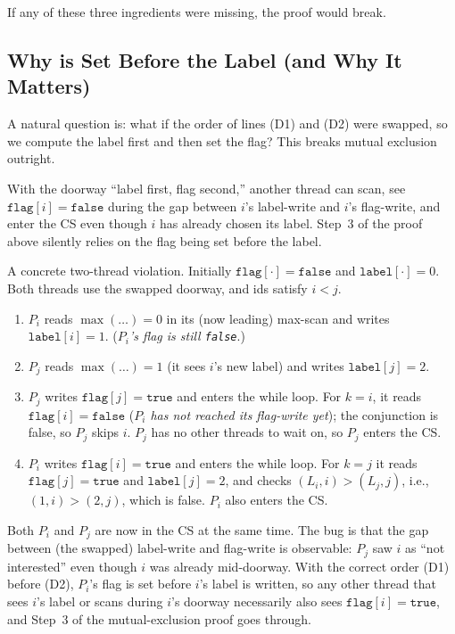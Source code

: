 If any of these three ingredients were missing, the proof would break.

\subsection{Why  is Set Before the Label (and Why It Matters)}

A natural question is: what if the order of lines (D1) and (D2) were swapped,
so we compute the label first and then set the flag? This breaks mutual
exclusion outright.

\begin{pppitfall}
\par
With the doorway ``label first, flag second,'' another thread can scan, see
$\texttt{flag}[i] = \texttt{false}$ during the gap between $i$'s label-write
and $i$'s flag-write, and enter the CS even though $i$ has already chosen its
label. Step~3 of the proof above silently relies on the flag being set before
the label.
\end{pppitfall}

\noindent
A concrete two-thread violation. Initially $\texttt{flag}[\cdot] = \texttt{false}$
and $\texttt{label}[\cdot] = 0$. Both threads use the swapped doorway, and ids
satisfy $i < j$.

\begin{enumerate}[nosep,leftmargin=2.2em]
  \item $P_i$ reads $\max(\ldots) = 0$ in its (now leading) max-scan and
        writes $\texttt{label}[i] = 1$. (\textit{$P_i$'s flag is still
        \texttt{false}}.)
  \item $P_j$ reads $\max(\ldots) = 1$ (it sees $i$'s new label) and writes
        $\texttt{label}[j] = 2$.
  \item $P_j$ writes $\texttt{flag}[j] = \texttt{true}$ and enters the while
        loop. For $k=i$, it reads $\texttt{flag}[i] = \texttt{false}$
        (\textit{$P_i$ has not reached its flag-write yet}); the conjunction is
        false, so $P_j$ skips $i$. $P_j$ has no other threads to wait on, so
        $P_j$ enters the CS.
  \item $P_i$ writes $\texttt{flag}[i] = \texttt{true}$ and enters the while
        loop. For $k=j$ it reads $\texttt{flag}[j] = \texttt{true}$ and
        $\texttt{label}[j] = 2$, and checks $(L_i, i) > (L_j, j)$, i.e.,
        $(1, i) > (2, j)$, which is false. $P_i$ also enters the CS.
\end{enumerate}

Both $P_i$ and $P_j$ are now in the CS at the same time. The bug is that the
gap between (the swapped) label-write and flag-write is observable: $P_j$ saw
$i$ as ``not interested'' even though $i$ was already mid-doorway. With the
correct order (D1) before (D2), $P_i$'s flag is set before $i$'s label is
written, so any other thread that sees $i$'s label or scans during $i$'s
doorway necessarily also sees $\texttt{flag}[i] = \texttt{true}$, and Step~3
of the mutual-exclusion proof goes through.

